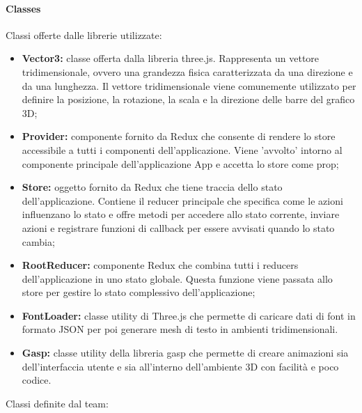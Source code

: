    \paragraph{Classes}
        Classi offerte dalle librerie utilizzate:
        \begin{itemize}
            \item \textbf{Vector3:} classe offerta dalla libreria three.js. Rappresenta un vettore tridimensionale, ovvero
            una grandezza fisica caratterizzata da una direzione e da una lunghezza. Il vettore tridimensionale
            viene comunemente utilizzato per definire la posizione, la rotazione, la scala e la direzione
            delle barre del grafico 3D;
            \item \textbf{Provider:} componente fornito da Redux che consente di rendere lo store
            accessibile a tutti i componenti dell’applicazione. Viene ’avvolto’ intorno al componente
            principale dell’applicazione App e accetta lo store come prop;
            \item \textbf{Store:} oggetto fornito da Redux che tiene traccia dello stato dell’applicazione. Contiene il
            reducer principale che specifica come le azioni influenzano lo stato e offre metodi per accedere allo stato
            corrente, inviare azioni e registrare funzioni di callback per essere avvisati quando lo stato
            cambia;
            \item \textbf{RootReducer:} componente Redux che combina tutti i reducers dell’applicazione in uno stato
            globale. Questa funzione viene passata allo store per gestire lo stato complessivo dell’applicazione;
            \item \textbf{FontLoader:} classe utility di Three.js che permette di caricare dati di font in formato JSON per poi generare mesh di testo in ambienti tridimensionali. 
            \item \textbf{Gasp:} classe utility della libreria gasp che permette di creare animazioni sia dell'interfaccia utente e sia all'interno dell'ambiente 3D con facilità e poco codice.
        \end{itemize}
        Classi definite dal team:
